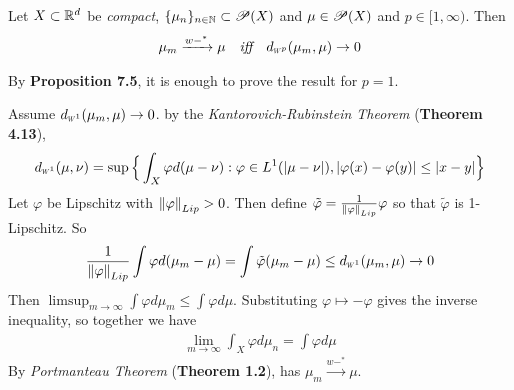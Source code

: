 \documentclass[12pt,a4paper]{article}
\newenvironment{proof}
{\begin{changemargin}{1cm}{0.5cm} 
	}%
	{\end{changemargin}
}
\newenvironment{p}
{\begin{proof} 
	}%
	{\end{proof}
}
\begin{document}
 Let $X\subset \mathbb{R}^d$ be \emph{compact}, $\{\mu_n\}_{n\in \mathbb{N}} \subset \mathscr{P}(X)$ and $\mu\in \mathscr{P}(X)$ and $p\in [1, \infty)$. Then
\begin{align*}
\mu_m \xrightarrow{w-^*} \mu \quad \emph{iff} \quad \wa{p}(\mu_m, \mu) \rightarrow 0
\end{align*}
\begin{p}
\pf By \textbf{Proposition 7.5}, it is enough to prove the result for $p=1$.

\quad Assume $\wa{1}(\mu_m, \mu)\rightarrow 0$. by the \emph{Kantorovich-Rubinstein Theorem} (\textbf{Theorem 4.13}),
\begin{align*}
\wa{1}(\mu, \nu) = \sup \Big\{ \int_X \varphi d(\mu -\nu) : \varphi\in L^1(|\mu-\nu|),  |\varphi(x) - \varphi(y)| \leq |x-y| \Big\}
\end{align*}
Let $\varphi$ be Lipschitz with $\snorms{\varphi}{Lip} >0$. Then define $\tilde{\varphi} = \frac{1}{\snorms{\varphi}{Lip}}\varphi$ so that $\tilde{\varphi}$ is 1-Lipschitz. So
\begin{align*}
\frac{1}{\snorms{\varphi}{Lip}} \int \varphi d(\mu_m -\mu) = \int \tilde{\varphi}(\mu_m - \mu) \leq \wa{1}(\mu_m, \mu) \rightarrow 0
\end{align*}
Then $\limsup_{m\rightarrow \infty} \int\varphi d\mu_m \leq \int\varphi d\mu$. Substituting $\varphi \mapsto -\varphi$ gives the inverse inequality, so together we have
\begin{align*}
\lim_{m\rightarrow \infty} \int_X \varphi d\mu_n = \int \varphi d\mu
\end{align*}
By \emph{Portmanteau Theorem} (\textbf{Theorem 1.2}), has $\mu_m \xrightarrow{w-^*} \mu$.
\s


\end{p}
\end{document}
